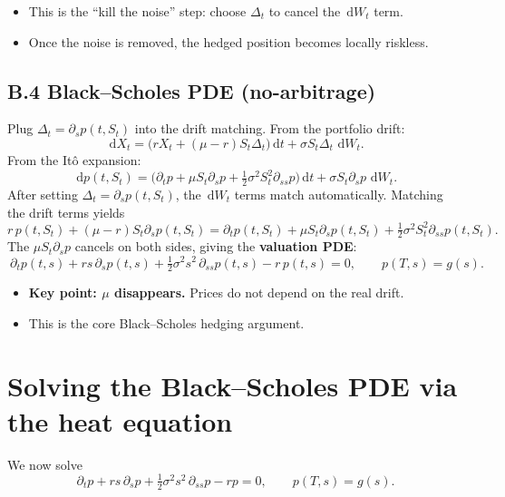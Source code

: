 \documentclass[11pt]{article}
\theoremstyle{definition}
\theoremstyle{remark}
\newcommand{\1}{\mathbf{1}}
\newcommand{\dd}{\,\mathrm{d}}
\theoremstyle{definition}
\begin{document}
\begin{itemize}[leftmargin=1.6em, itemsep=0.2em]
\item This is the ``kill the noise'' step: choose $\Delta_t$ to cancel the $\dd W_t$ term.
\item Once the noise is removed, the hedged position becomes locally riskless.
\end{itemize}

\subsection*{B.4 Black--Scholes PDE (no-arbitrage)}
Plug $\Delta_t=\partial_s p(t,S_t)$ into the drift matching.
From the portfolio drift:
\[
\dd X_t
=
\Big(rX_t+(\mu-r)S_t\Delta_t\Big)\dd t
+\sigma S_t\Delta_t\,\dd W_t.
\]
From the It\^o expansion:
\[
\dd p(t,S_t)
=
\Big(\partial_t p+\mu S_t\partial_s p+\tfrac12\sigma^2 S_t^2\partial_{ss}p\Big)\dd t
+\sigma S_t\partial_s p\,\dd W_t.
\]
After setting $\Delta_t=\partial_s p(t,S_t)$, the $\dd W_t$ terms match automatically.
Matching the drift terms yields
\[
r\,p(t,S_t)+(\mu-r)S_t\partial_s p(t,S_t)
=
\partial_t p(t,S_t)+\mu S_t\partial_s p(t,S_t)
+\tfrac12\sigma^2 S_t^2\partial_{ss}p(t,S_t).
\]
The $\mu S_t\partial_s p$ cancels on both sides, giving the \textbf{valuation PDE}:
\[
\boxed{\ 
\partial_t p(t,s)+rs\,\partial_s p(t,s)
+\tfrac12\sigma^2 s^2\,\partial_{ss}p(t,s)-r\,p(t,s)=0,
\qquad p(T,s)=g(s).
\ }
\]

\begin{itemize}[leftmargin=1.6em, itemsep=0.2em]
\item \textbf{Key point: $\mu$ disappears.} Prices do not depend on the real drift.
\item This is the core Black--Scholes hedging argument.
\end{itemize}

\section*{Solving the Black--Scholes PDE via the heat equation}

We now solve
\[
\partial_t p + rs\,\partial_s p + \tfrac12\sigma^2 s^2\,\partial_{ss}p - rp = 0,
\qquad p(T,s)=g(s).
\]

\end{document}
